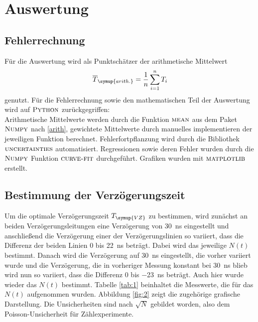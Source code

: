 \documentclass[
  bibliography=totoc,     %
  captions=tableheading,  %
  titlepage=firstiscover, %
]{scrartcl}
\begin{document}
\section{Auswertung}
\label{sec:auswertung}

\subsection{Fehlerrechnung}
  Für die Auswertung wird als Punktschätzer der arithmetische Mittelwert
  \begin{equation}
    \overline{T}_{\symup{arith.}} = \frac{1}{n} \sum_{i=1}^{n} T_{i}
    \label{arith}
  \end{equation}
  genutzt.
    Für die Fehlerrechnung sowie den mathematischen Teil der Auswertung wird auf
    $\textsc{Python}$ zurückgegriffen:\\
    Arithmetische Mittelwerte werden durch die Funktion $\textsc{mean}$ aus dem
    Paket $\textsc{Numpy}$ nach \eqref{arith},
    gewichtete Mittelwerte durch manuelles implementieren der jeweiligen
    Funktion berechnet. Fehlerfortpflanzung wird durch die Bibliothek
    $\textsc{uncertainties}$ automatisiert. Regressionen
    sowie deren Fehler wurden durch die $\textsc{Numpy}$ Funktion
    $\textsc{curve-fit}$ durchgeführt. Grafiken wurden mit $\textsc{matplotlib}$
    erstellt.
\subsection{Bestimmung der Verzögerungszeit}
Um die optimale Verzögerungszeit $T_{\symup{VZ}}$ zu bestimmen, wird zunächst an beiden
Verzögerungsleitungen eine Verzögerung von \SI{30}{\nano\second} eingestellt und
anschließend die Verzögerung einer der Verzögerungslinien so variiert, dass die Differenz
der beiden Linien 0 bis \SI{22}{\nano\second} beträgt. Dabei wird das jeweilige $N(t)$ bestimmt.
Danach wird die Verzögerung auf \SI{30}{\nano\second} eingestellt, die vorher variiert
wurde und die Verzögerung, die in vorheriger Messung konstant bei \SI{30}{\nano\second}
blieb wird nun so variiert, dass die Differenz 0 bis \SI{-23}{\nano\second} beträgt.
Auch hier wurde wieder das $N(t)$ bestimmt. Tabelle \ref{tab:1} beinhaltet die
Messwerte, die für das $N(t)$ aufgenommen wurden. Abbildung \ref{fig:2} zeigt die
zugehörige grafische Darstellung. Die Unsicherheiten sind nach $\sqrt{N}$ gebildet
worden, also dem Poisson-Unsicherheit für Zählexperimente.
\end{document}
